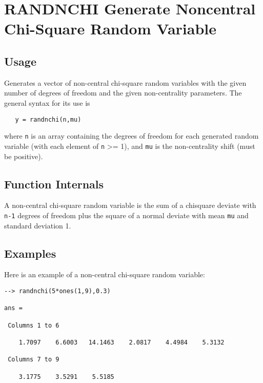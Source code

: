\section{RANDNCHI Generate Noncentral Chi-Square Random Variable}

\subsection{Usage}

Generates a vector of non-central chi-square random variables
with the given number of degrees of freedom and the given
non-centrality parameters.  The general syntax for its use is
\begin{verbatim}
   y = randnchi(n,mu)
\end{verbatim}
where \verb|n| is an array containing the degrees of freedom for
each generated random variable (with each element of \verb|n| >= 1),
and \verb|mu| is the non-centrality shift (must be positive).
\subsection{Function Internals}

A non-central chi-square random variable is the sum of a chisquare
deviate with \verb|n-1| degrees of freedom plus the square of a normal
deviate with mean \verb|mu| and standard deviation 1.
\subsection{Examples}

Here is an example of a non-central chi-square random variable:
\begin{verbatim}
--> randnchi(5*ones(1,9),0.3)

ans = 

 Columns 1 to 6

    1.7097    6.6003   14.1463    2.0817    4.4984    5.3132 

 Columns 7 to 9

    3.1775    3.5291    5.5185 
\end{verbatim}
